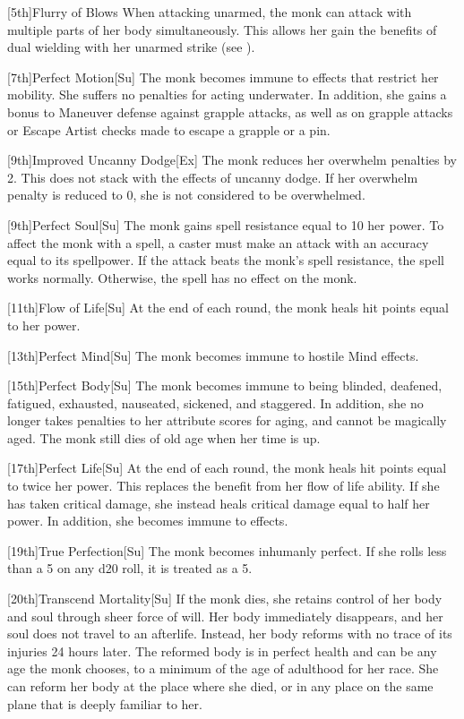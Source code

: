 [5th]{Flurry of Blows}
When attacking unarmed, the monk can attack with multiple parts of her body simultaneously.
This allows her gain the benefits of dual wielding with her unarmed strike (see ).

[7th]{Perfect Motion}[Su]
The monk becomes immune to effects that restrict her mobility.
She suffers no penalties for acting underwater.
In addition, she gains a  bonus to Maneuver defense against grapple attacks, as well as on grapple attacks or Escape Artist checks made to escape a grapple or a pin.

[9th]{Improved Uncanny Dodge}[Ex]
The monk reduces her overwhelm penalties by 2.
This does not stack with the effects of uncanny dodge.
If her overwhelm penalty is reduced to 0, she is not considered to be overwhelmed.

[9th]{Perfect Soul}[Su]
The monk gains spell resistance equal to 10 \add her \ki power.
To affect the monk with a spell, a caster must make an attack with an accuracy equal to its spellpower.
If the attack beats the monk's spell resistance, the spell works normally.
Otherwise, the spell has no effect on the monk.

[11th]{Flow of Life}[Su]
At the end of each round, the monk heals hit points equal to her \ki power.

[13th]{Perfect Mind}[Su]
The monk becomes immune to hostile Mind effects.

[15th]{Perfect Body}[Su]
The monk becomes immune to being blinded, deafened, fatigued, exhausted, nauseated, sickened, and staggered.
In addition, she no longer takes penalties to her attribute scores for aging, and cannot be magically aged.
The monk still dies of old age when her time is up.

[17th]{Perfect Life}[Su]
At the end of each round, the monk heals hit points equal to twice her \ki power.
This replaces the benefit from her flow of life ability.
If she has taken critical damage, she instead heals critical damage equal to half her \ki power.
In addition, she becomes immune to  effects.

[19th]{True Perfection}[Su]
The monk becomes inhumanly perfect.
If she rolls less than a 5 on any d20 roll, it is treated as a 5.

[20th]{Transcend Mortality}[Su]
If the monk dies, she retains control of her body and soul through sheer force of will.
Her body immediately disappears, and her soul does not travel to an afterlife.
Instead, her body reforms with no trace of its injuries 24 hours later.
The reformed body is in perfect health and can be any age the monk chooses, to a minimum of the age of adulthood for her race.
She can reform her body at the place where she died, or in any place on the same plane that is deeply familiar to her.

